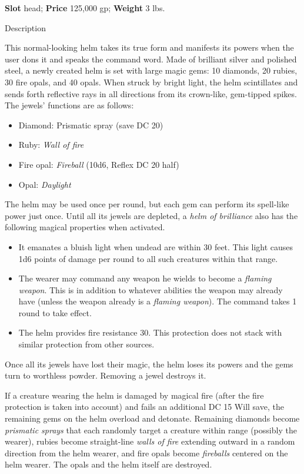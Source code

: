\textbf{Slot} head; \textbf{Price} 125,000 gp; \textbf{Weight} 3 lbs.
				
Description
				
This normal-looking helm takes its true form and manifests its powers when the user dons it and speaks the command word. Made of brilliant silver and polished steel, a newly created helm is set with large magic gems: 10 diamonds, 20 rubies, 30 fire opals, and 40 opals. When struck by bright light, the helm scintillates and sends forth reflective rays in all directions from its crown-like, gem-tipped spikes. The jewels' functions are as follows:
				\begin{itemize}\item  Diamond: Prismatic spray (save DC 20)
				\item  Ruby: \textit{Wall of fire}
				\item  Fire opal: \textit{Fireball} (10d6, Reflex DC 20 half)
				\item  Opal: \textit{Daylight}
\end{itemize}
				
The helm may be used once per round, but each gem can perform its spell-like power just once. Until all its jewels are depleted, a \textit{helm of brilliance} also has the following magical properties when activated.
				\begin{itemize}\item  It emanates a bluish light when undead are within 30 feet. This light causes 1d6 points of damage per round to all such creatures within that range.
				\item  The wearer may command any weapon he wields to become a \textit{flaming weapon}. This is in addition to whatever abilities the weapon may already have (unless the weapon already is a \textit{flaming weapon}). The command takes 1 round to take effect.
				\item  The helm provides fire resistance 30. This protection does not stack with similar protection from other sources.
\end{itemize}
				
Once all its jewels have lost their magic, the helm loses its powers and the gems turn to worthless powder. Removing a jewel destroys it.
				
If a creature wearing the helm is damaged by magical fire (after the fire protection is taken into account) and fails an additional DC 15 Will save, the remaining gems on the helm overload and detonate. Remaining diamonds become \textit{prismatic sprays} that each randomly target a creature within range (possibly the wearer), rubies become straight-line \textit{walls of fire} extending outward in a random direction from the helm wearer, and fire opals become \textit{fireballs }centered on the helm wearer. The opals and the helm itself are destroyed. 
				
